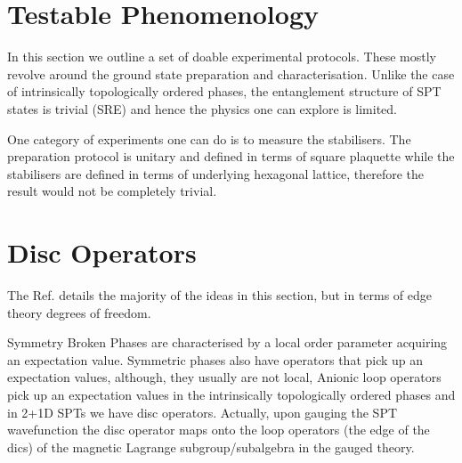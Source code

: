 \documentclass[a4paper,twocolumn,11pt]{quantumarticle}
\begin{document}
\section{Testable Phenomenology}

In this section we outline a set of doable experimental protocols. These mostly revolve around the ground state preparation and characterisation.
Unlike the case of intrinsically topologically ordered phases, the entanglement structure of SPT states is trivial (SRE) and hence the physics one can explore is limited.

One category of experiments one can do is to measure the stabilisers. The preparation protocol is unitary and defined in terms of square plaquette while the stabilisers are defined in terms of underlying hexagonal lattice, therefore the result would not be completely trivial.

\section{Disc Operators}

The Ref. \cite{Kawagoe_2021} details the majority of the ideas in this section, but in terms of edge theory degrees of freedom.

Symmetry Broken Phases are characterised by a local order parameter acquiring an expectation value. Symmetric phases also have operators that pick up an expectation values, although, they usually are not local, Anionic loop operators pick up an expectation values in the intrinsically topologically ordered phases and in 2+1D SPTs we have disc operators. Actually, upon gauging the SPT wavefunction the disc operator maps onto the loop operators (the edge of the dics) of the magnetic Lagrange subgroup/subalgebra in the gauged theory.
\end{document}
